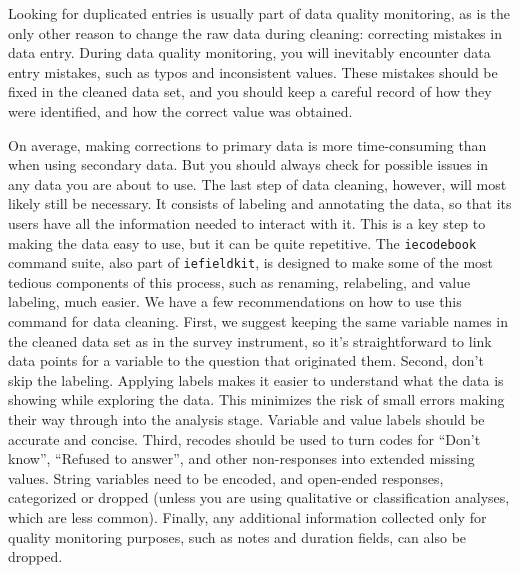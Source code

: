 Looking for duplicated entries is usually part of data quality monitoring,
as is the only other reason to change the raw data during cleaning:
correcting mistakes in data entry.
During data quality monitoring, you will inevitably encounter data entry mistakes,
such as typos and inconsistent values.
These mistakes should be fixed in the cleaned data set,
and you should keep a careful record of how they were identified,
and how the correct value was obtained.

On average, making corrections to primary data is more time-consuming than when using secondary data.
But you should always check for possible issues in any data you are about to use.
The last step of data cleaning, however, will most likely still be necessary.
It consists of labeling and annotating the data, so that its users have all the 
information needed to interact with it.
This is a key step to making the data easy to use, but it can be quite repetitive.
The \texttt{iecodebook} command suite, also part of \texttt{iefieldkit},
is designed to make some of the most tedious components of this process,
such as renaming, relabeling, and value labeling, much easier.
We have a few recommendations on how to use this command for data cleaning.
First, we suggest keeping the same variable names in the cleaned data set as in the survey instrument, so it's straightforward to link data points for a variable to the question that originated them.
Second, don't skip the labeling.
Applying labels makes it easier to understand what the data is showing while exploring the data. 
This minimizes the risk of small errors making their way through into the analysis stage.
Variable and value labels should be accurate and concise.
Third, recodes should be used to turn codes for ``Don't know'', ``Refused to answer'', and
other non-responses into extended missing values.
String variables need to be encoded, and open-ended responses, categorized or dropped
(unless you are using qualitative or classification analyses, which are less common).
Finally, any additional information collected only for quality monitoring purposes,
such as notes and duration fields, can also be dropped.


